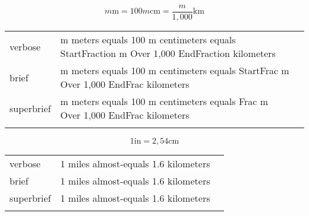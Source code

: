 \E \[m\text{m} = 100m\text{cm}=\frac{m}{1,000}\text{km}\]
\begin{longtable}[c]{@{}lll@{}}
\toprule\addlinespace
verbose & m meters equals 100 m centimeters equals StartFraction m Over
1,000 EndFraction kilometers &

\\\addlinespace
brief & m meters equals 100 m centimeters equals StartFrac m Over 1,000
EndFrac kilometers &

\\\addlinespace
superbrief & m meters equals 100 m centimeters equals Frac m Over 1,000
EndFrac kilometers &

\\\addlinespace
\bottomrule
\end{longtable}


\E \[1\text{in}=2,54\text{cm}\]
\begin{longtable}[c]{@{}lll@{}}
\toprule\addlinespace
verbose & 1 miles almost-equals 1.6 kilometers &

\\\addlinespace
brief & 1 miles almost-equals 1.6 kilometers &

\\\addlinespace
superbrief & 1 miles almost-equals 1.6 kilometers &

\\\addlinespace
\bottomrule
\end{longtable}




